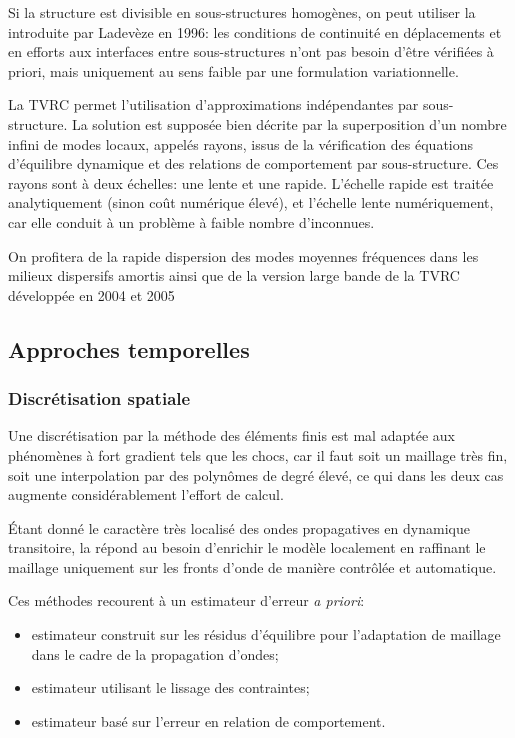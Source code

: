 Si la structure est divisible en sous-structures homogènes, on peut utiliser la  introduite
par Ladevèze en 1996:
les conditions de continuité en déplacements et en efforts aux interfaces entre
sous-structures n'ont pas besoin d'être vérifiées à priori, mais uniquement au sens faible par une
formulation variationnelle.

La TVRC permet l'utilisation d'approximations indépendantes par sous-structure.
La solution est supposée bien décrite par la superposition d'un nombre infini de modes locaux, appelés rayons, issus de la vérification des équations d'équilibre dynamique et des relations de comportement par sous-structure. Ces rayons sont à deux échelles: une lente et une rapide. L'échelle rapide est traitée analytiquement (sinon coût numérique élevé), et l'échelle lente numériquement, car elle conduit à un problème à faible nombre d'inconnues.

On profitera de la rapide dispersion des modes moyennes fréquences dans les milieux dispersifs amortis ainsi que de la version large bande de la TVRC développée en 2004 et 2005~\cite{Lit-Chevreuil}

\medskip
\subsection{Approches temporelles}

\subsubsection{Discrétisation spatiale}
Une discrétisation par la méthode des éléments finis est mal adaptée aux phénomènes à fort gradient tels
que les chocs, car il faut soit un maillage très fin, soit une interpolation par des polynômes
de degré élevé, ce qui dans les deux cas augmente considérablement l'effort de calcul.

Étant donné le caractère très localisé des ondes propagatives en dynamique transitoire,
la  répond au besoin d'enrichir le modèle
localement en raffinant le maillage uniquement sur les fronts d'onde de manière contrôlée et
automatique.

Ces méthodes recourent à un estimateur d'erreur \emph{a priori}:
\begin{itemize}
	\item estimateur construit sur les résidus d'équilibre pour l'adaptation de
		maillage dans le cadre de la propagation d'ondes;
	\item estimateur utilisant le lissage des contraintes;
	\item estimateur basé sur l'erreur en relation de comportement.
\end{itemize}

